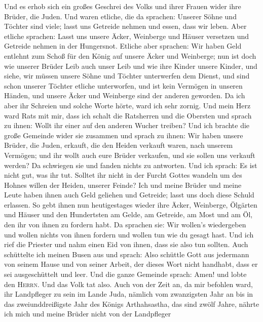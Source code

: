  Und es erhob sich ein großes Geschrei des Volks und ihrer
Frauen wider ihre Brüder, die Juden.  Und waren etliche,
die da sprachen: Unserer Söhne und Töchter sind viele; lasst uns
Getreide nehmen und essen, dass wir leben.  Aber etliche
sprachen: Lasst uns unsere Äcker, Weinberge und Häuser versetzen und
Getreide nehmen in der Hungersnot.  Etliche aber sprachen:
Wir haben Geld entlehnt zum Schoß für den König auf unsere Äcker und
Weinberge;  nun ist doch wie unserer Brüder Leib auch
unser Leib und wie ihre Kinder unsere Kinder, und siehe, wir müssen
unsere Söhne und Töchter unterwerfen dem Dienst, und sind schon unserer
Töchter etliche unterworfen, und ist kein Vermögen in unseren Händen,
und unsere Äcker und Weinberge sind der anderen geworden. 
Da ich aber ihr Schreien und solche Worte hörte, ward ich sehr zornig.
 Und mein Herz ward Rats mit mir, dass ich schalt die
Ratsherren und die Obersten und sprach zu ihnen: Wollt ihr einer auf den
anderen Wucher treiben? Und ich brachte die große Gemeinde wider sie
zusammen  und sprach zu ihnen: Wir haben unsere Brüder,
die Juden, erkauft, die den Heiden verkauft waren, nach unserem
Vermögen; und ihr wollt auch eure Brüder verkaufen, und sie sollen uns
verkauft werden? Da schwiegen sie und fanden nichts zu antworten.
 Und ich sprach: Es ist nicht gut, was ihr tut. Solltet
ihr nicht in der Furcht Gottes wandeln um des Hohnes willen der Heiden,
unserer Feinde?  Ich und meine Brüder und meine Leute
haben ihnen auch Geld geliehen und Getreide; lasst uns doch diese Schuld
erlassen.  So gebt ihnen nun heutigestages wieder ihre
Äcker, Weinberge, Ölgärten und Häuser und den Hundertsten am Gelde, am
Getreide, am Most und am Öl, den ihr von ihnen zu fordern habt.
 Da sprachen sie: Wir wollen's wiedergeben und wollen
nichts von ihnen fordern und wollen tun wie du gesagt hast. Und ich rief
die Priester und nahm einen Eid von ihnen, dass sie also tun sollten.
 Auch schüttelte ich meinen Busen aus und sprach: Also
schüttle Gott aus jedermann von seinem Hause und von seiner Arbeit, der
dieses Wort nicht handhabt, dass er sei ausgeschüttelt und leer. Und die
ganze Gemeinde sprach: Amen! und lobte den \textsc{Herrn}. Und das Volk
tat also.  Auch von der Zeit an, da mir befohlen ward,
ihr Landpfleger zu sein im Lande Juda, nämlich vom zwanzigsten Jahr an
bis in das zweiunddreißigste Jahr des Königs Arthahsastha, das sind
zwölf Jahre, nährte ich mich und meine Brüder nicht von der Landpfleger
